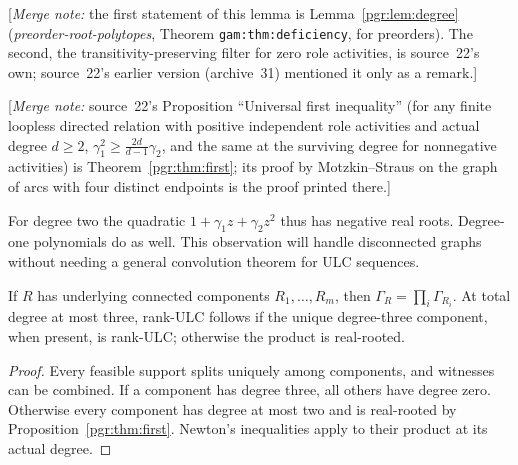 \documentclass[11pt]{article}
\numberwithin{equation}{section}
\theoremstyle{definition}\newtheorem{definition}[theorem]{Definition}\newtheorem{remark}[theorem]{Remark}
\newcommand{\Ga}{\Gamma}                   %
\newcommand{\mnote}[1]{[\textit{Merge note:} #1]}
\newcommand{\prp}{\emph{preorder-root-polytopes}}
\begin{document}
\mnote{the first statement of this lemma is Lemma~\ref{pgr:lem:degree}
(\prp, Theorem \texttt{gam:thm:deficiency}, for preorders). The second,
the transitivity-preserving filter for zero role activities, is source~22's
own; source~22's earlier version (archive~31) mentioned it only as a
remark.}


\mnote{source~22's Proposition ``Universal first inequality'' (for any
finite loopless directed relation with positive independent role
activities and actual degree $d\ge2$, $\gamma_1^2\ge\frac{2d}{d-1}\gamma_2$,
and the same at the surviving degree for nonnegative activities) is
Theorem~\ref{pgr:thm:first}; its proof by Motzkin--Straus on the graph of
arcs with four distinct endpoints is the proof printed there.}

For degree two the quadratic $1+\gamma_1 z+\gamma_2z^2$ thus has negative real roots. Degree-one polynomials do as well. This observation will handle disconnected graphs without needing a general convolution theorem for ULC sequences.

\begin{lemma}\label{pgr:r:ir:lem:products}
If $R$ has underlying connected components $R_1,\ldots,R_m$, then $\Ga_R=\prod_i\Ga_{R_i}$. At total degree at most three, rank-ULC follows if the unique degree-three component, when present, is rank-ULC; otherwise the product is real-rooted.
\end{lemma}
\begin{proof}
Every feasible support splits uniquely among components, and witnesses can be combined. If a component has degree three, all others have degree zero. Otherwise every component has degree at most two and is real-rooted by Proposition~\ref{pgr:thm:first}. Newton's inequalities apply to their product at its actual degree.
\end{proof}
\end{document}
